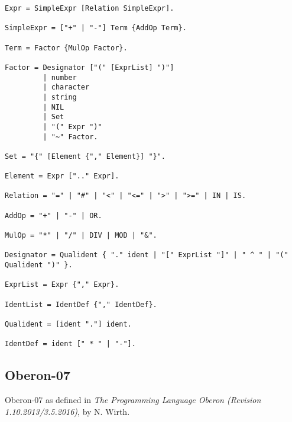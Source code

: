 \documentclass[12pt]{article}
\begin{document}
{\begin{lstlisting}[style=EBNF]
Expr = SimpleExpr [Relation SimpleExpr].

SimpleExpr = ["+" | "-"] Term {AddOp Term}.

Term = Factor {MulOp Factor}.

Factor = Designator ["(" [ExprList] ")"] 
         | number 
         | character 
         | string 
         | NIL 
         | Set 
         | "(" Expr ")" 
         | "~" Factor. 

Set = "{" [Element {"," Element}] "}".

Element = Expr [".." Expr].

Relation = "=" | "#" | "<" | "<=" | ">" | ">=" | IN | IS.

AddOp = "+" | "-" | OR.

MulOp = "*" | "/" | DIV | MOD | "&".

Designator = Qualident { "." ident | "[" ExprList "]" | " ^ " | "(" Qualident ")" }. 

ExprList = Expr {"," Expr}.

IdentList = IdentDef {"," IdentDef}.

Qualident = [ident "."] ident.

IdentDef = ident [" * " | "-"].
\end{lstlisting}}

\subsection{Oberon-07}

Oberon-07 as defined in {\em The Programming Language Oberon (Revision 1.10.2013/3.5.2016)}, by N. Wirth.
\end{document}
